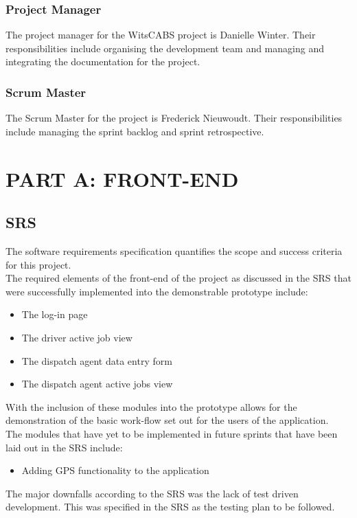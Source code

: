 \documentclass[12pt]{article}
\begin{document}
\subsubsection{Project Manager}
The project manager for the WitsCABS project is Danielle Winter. Their responsibilities include organising the development team and managing and integrating the documentation for the project. 
\subsubsection{Scrum Master}
The Scrum Master for the project is Frederick Nieuwoudt. Their responsibilities include managing the sprint backlog and sprint retrospective.   

\newpage
\section{PART A: FRONT-END}
\subsection{SRS}
The software requirements specification quantifies the scope and success criteria for this project. \\ 

The required elements of the front-end of the project as discussed in the SRS that were successfully implemented into the demonstrable prototype include:
\begin{itemize}
\item The log-in page
\item The driver active job view
\item The dispatch agent data entry form
\item The dispatch agent active jobs view
\end{itemize}
With the inclusion of these modules into the prototype allows for the demonstration of the basic work-flow set out for the users of the application.\\

The modules that have yet to be implemented in future sprints that have been laid out in the SRS include:
\begin{itemize}
\item Adding GPS functionality to the application
\end{itemize}

The major downfalls according to the SRS was the lack of test driven development. This was specified in the SRS as the testing plan to be followed.
\end{document}
